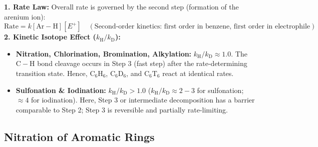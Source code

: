 \documentclass[10pt,a4paper]{article}
\begin{document}
\begin{formulabox}
\textbf{1. Rate Law:} Overall rate is governed by the second step (formation of the arenium ion):
\begin{equation}
  \text{Rate} = k[\mathrm{Ar-H}][E^+] \quad (\text{Second-order kinetics: first order in benzene, first order in electrophile})
\end{equation}
\textbf{2. Kinetic Isotope Effect ($k_{\mathrm{H}} / k_{\mathrm{D}}$):}
\begin{itemize}
  \item \textbf{Nitration, Chlorination, Bromination, Alkylation:} $k_{\mathrm{H}} / k_{\mathrm{D}} \approx 1.0$. The $\mathrm{C-H}$ bond cleavage occurs in Step 3 (fast step) after the rate-determining transition state. Hence, $\mathrm{C_6H_6}$, $\mathrm{C_6D_6}$, and $\mathrm{C_6T_6}$ react at identical rates.
  \item \textbf{Sulfonation \& Iodination:} $k_{\mathrm{H}} / k_{\mathrm{D}} > 1.0$ ($k_{\mathrm{H}}/k_{\mathrm{D}} \approx 2-3$ for sulfonation; $\approx 4$ for iodination). Here, Step 3 or intermediate decomposition has a barrier comparable to Step 2; Step 3 is reversible and partially rate-limiting.
\end{itemize}
\end{formulabox}

\subsection{Nitration of Aromatic Rings}
\end{document}
